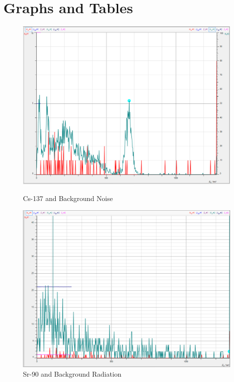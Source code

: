 \documentclass{amsart}
\begin{document}
\section{Graphs and Tables}
\begin{figure}[H]
    \begin{minipage}{0.49\textwidth}
        \centering
        \includegraphics[width=\textwidth]{CSnoise.png}
        \caption{\newline Cs-137 and Background Noise}
    \end{minipage}
    \begin{minipage}{0.49\textwidth}
        \centering
        \includegraphics[width=\textwidth]{Sr-90.png}
        \caption{\newline Sr-90 and Background Radiation}
    \end{minipage}
\end{figure}
\end{document}
